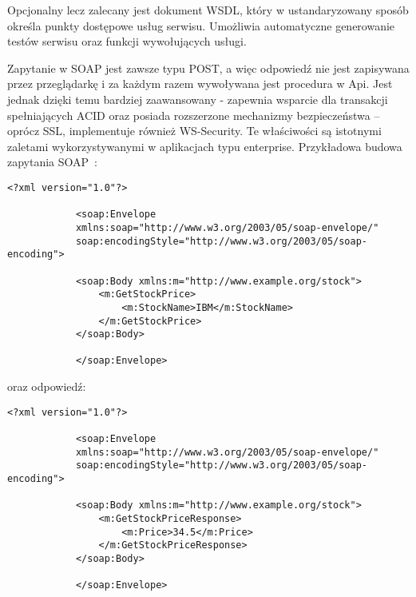 		Opcjonalny lecz zalecany jest dokument WSDL, który w ustandaryzowany sposób określa punkty dostępowe usług serwisu.
		Umożliwia automatyczne generowanie testów serwisu oraz funkcji wywołujących usługi.
		
		Zapytanie w SOAP jest zawsze typu POST, a więc odpowiedź nie jest zapisywana przez przeglądarkę i za każdym razem wywoływana jest procedura w Api.
		Jest jednak dzięki temu bardziej zaawansowany - zapewnia wsparcie dla transakcji spełniających ACID
		oraz posiada rozszerzone mechanizmy bezpieczeństwa -- oprócz SSL, implementuje również WS-Security.
		Te właściwości są istotnymi zaletami wykorzystywanymi w aplikacjach typu enterprise.\newline
		Przykładowa budowa zapytania SOAP~\cite{SoapMsg}:

		\begin{lstlisting}[label=lst:soapReq, xleftmargin=0.5cm]
			<?xml version="1.0"?>

			<soap:Envelope
			xmlns:soap="http://www.w3.org/2003/05/soap-envelope/"
			soap:encodingStyle="http://www.w3.org/2003/05/soap-encoding">

			<soap:Body xmlns:m="http://www.example.org/stock">
				<m:GetStockPrice>
					<m:StockName>IBM</m:StockName>
				</m:GetStockPrice>
			</soap:Body>

			</soap:Envelope>
		\end{lstlisting}
		oraz odpowiedź:
		\begin{lstlisting}[label=lst:soapRes, xleftmargin=0.5cm]
			<?xml version="1.0"?>

			<soap:Envelope
			xmlns:soap="http://www.w3.org/2003/05/soap-envelope/"
			soap:encodingStyle="http://www.w3.org/2003/05/soap-encoding">

			<soap:Body xmlns:m="http://www.example.org/stock">
				<m:GetStockPriceResponse>
					<m:Price>34.5</m:Price>
				</m:GetStockPriceResponse>
			</soap:Body>

			</soap:Envelope>
		\end{lstlisting}
			
